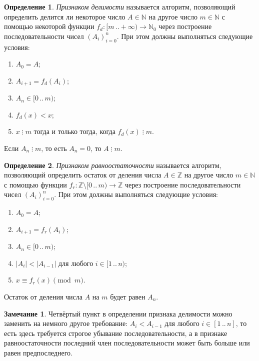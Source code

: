 \documentclass[14pt, a4paper]{extarticle}
\theoremstyle{definition}
\newtheorem*{definition}{Определение}
\newtheorem*{remark}{Замечание}
\newcommand{\divisible}{\mathop{\vdots}}
\begin{document}
	\begin{definition}
		\emph{Признаком делимости} называется алгоритм, позволяющий определить делится ли некоторое число $A\in\mathbb{N}$ на другое число $m\in\mathbb{N}$ с помощью некоторой функции $f_d\colon[m\,..+\infty)\to\mathbb{N}_0$ через построение последовательности чисел $(A_i)_{i=0}^n$. При этом должны выполняться следующие условия:
		\begin{enumerate}[topsep=0pt,itemsep=-1ex,partopsep=1ex,parsep=1ex]
			\item $A_0=A$;
			\item $A_{i+1}=f_d(A_i)$;
			\item $A_n\in[0\,..\,m)$;
			\item $f_d(x)<x$;
			\item $x\divisible m$ тогда и только тогда, когда $f_d(x)\divisible m$.
		\end{enumerate}
		Если $A_n\divisible m$, то есть $A_n=0$, то $A\divisible m$.
	\end{definition}

	\begin{definition}
		\emph{Признаком равноостаточности} называется алгоритм, позволяющий определить остаток от деления числа $A\in\mathbb{Z}$ на другое число $m\in\mathbb{N}$ с помощью функции $f_r\colon\mathbb{Z}\setminus[0\,..\,m)\to\mathbb{Z}$ через построение последовательности чисел $(A_i)_{i=0}^n$. При этом должны выполняться следующие условия:
		\begin{enumerate}[topsep=0pt,itemsep=-1ex,partopsep=1ex,parsep=1ex]
			\item $A_0=A$;
			\item $A_{i+1}=f_r(A_i)$;
			\item $A_n\in[0\,..\,m)$;
			\item $|A_i|<|A_{i-1}|$ для любого $i\in[1\,..\,n)$;
			\item $x\equiv f_r(x)\pmod m$.
		\end{enumerate}
		Остаток от деления числа $A$ на $m$ будет равен $A_n$.
	\end{definition}

	\begin{remark}
		Четвёртый пункт в определении признака делимости можно заменить на немного другое требование: $A_i<A_{i-1}$ для любого $i\in[1\,..\,n]$, то есть здесь требуется строгое убывание последовательности, а в признаке равноостаточности последний член последовательности может быть больше или равен предпоследнего.
	\end{remark}
\end{document}
